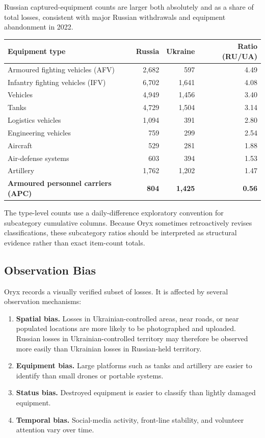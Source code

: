 \documentclass[a4paper,11pt]{article}
\begin{document}
Russian captured-equipment counts are larger both absolutely and as a share of total losses, consistent with major Russian withdrawals and equipment abandonment in 2022.

\begin{longtable}{lrrr}
\toprule
Equipment type & Russia & Ukraine & Ratio (RU/UA) \\
\midrule
\endhead
Armoured fighting vehicles (AFV) & 2,682 & 597 & 4.49 \\
Infantry fighting vehicles (IFV) & 6,702 & 1,641 & 4.08 \\
Vehicles & 4,949 & 1,456 & 3.40 \\
Tanks & 4,729 & 1,504 & 3.14 \\
Logistics vehicles & 1,094 & 391 & 2.80 \\
Engineering vehicles & 759 & 299 & 2.54 \\
Aircraft & 529 & 281 & 1.88 \\
Air-defense systems & 603 & 394 & 1.53 \\
Artillery & 1,762 & 1,202 & 1.47 \\
\textbf{Armoured personnel carriers (APC)} & \textbf{804} & \textbf{1,425} & \textbf{0.56} \\
\bottomrule
\end{longtable}

The type-level counts use a daily-difference exploratory convention for subcategory cumulative columns. Because Oryx sometimes retroactively revises classifications, these subcategory ratios should be interpreted as structural evidence rather than exact item-count totals.

\subsection{Observation Bias}

Oryx records a visually verified subset of losses. It is affected by several observation mechanisms:

\begin{enumerate}
  \item \textbf{Spatial bias.} Losses in Ukrainian-controlled areas, near roads, or near populated locations are more likely to be photographed and uploaded. Russian losses in Ukrainian-controlled territory may therefore be observed more easily than Ukrainian losses in Russian-held territory.
  \item \textbf{Equipment bias.} Large platforms such as tanks and artillery are easier to identify than small drones or portable systems.
  \item \textbf{Status bias.} Destroyed equipment is easier to classify than lightly damaged equipment.
  \item \textbf{Temporal bias.} Social-media activity, front-line stability, and volunteer attention vary over time.
\end{enumerate}
\end{document}
